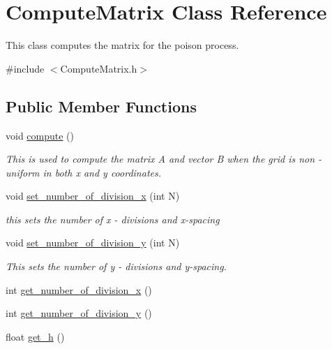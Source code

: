 \hypertarget{class_compute_matrix}{}\section{Compute\+Matrix Class Reference}
\label{class_compute_matrix}


This class computes the matrix for the poison process.  




{\ttfamily \#include $<$Compute\+Matrix.\+h$>$}

\subsection*{Public Member Functions}
\begin{DoxyCompactItemize}
\item 
void \hyperlink{class_compute_matrix_afb37e6716654b85a48c4feb6967ed473}{compute} ()
\begin{DoxyCompactList}\small\item\em This is used to compute the matrix A and vector B when the grid is non -\/ uniform in both x and y coordinates. \end{DoxyCompactList}\item 
void \hyperlink{class_compute_matrix_afb92e288133bac50dd7fd4ea44ddc648}{set\+\_\+number\+\_\+of\+\_\+division\+\_\+x} (int N)
\begin{DoxyCompactList}\small\item\em this sets the number of x -\/ divisions and x-\/spacing \end{DoxyCompactList}\item 
void \hyperlink{class_compute_matrix_a8f161a17f274122b4f17c4c90c288a54}{set\+\_\+number\+\_\+of\+\_\+division\+\_\+y} (int N)
\begin{DoxyCompactList}\small\item\em This sets the number of y -\/ divisions and y-\/spacing. \end{DoxyCompactList}\item 
int \hyperlink{class_compute_matrix_a35f69618292d8a05d78158715f1a8691}{get\+\_\+number\+\_\+of\+\_\+division\+\_\+x} ()
\item 
int \hyperlink{class_compute_matrix_af726fb06dd8cc67d1d52ec3b9357b287}{get\+\_\+number\+\_\+of\+\_\+division\+\_\+y} ()
\item 
float \hyperlink{class_compute_matrix_ac6cc697a109dfdc3a27a4ef2bc131b67}{get\+\_\+h} ()
\item 

\end{DoxyCompactItemize}
